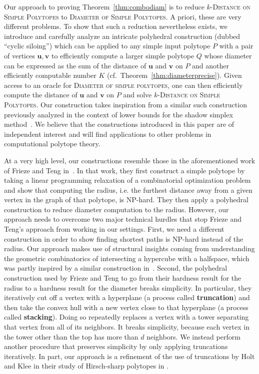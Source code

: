 \documentclass[centering,11pt,reqno]{amsart}
\theoremstyle{definition}
\newcommand{\NP}{\textsc{NP}}
\begin{document}
Our approach to proving Theorem~\ref{thm:combodiam} is to reduce \textsc{$k$-Distance on Simple Polytopes} to \textsc{Diameter of Simple Polytopes}. A priori, these are very different problems. To show that such a reduction nevertheless exists, we introduce and carefully analyze an intricate polyhedral construction (dubbed ``cyclic siloing'') which can be applied to any simple input polytope $P$ with a pair of vertices $\mathbf{u},\mathbf{v}$ to efficiently compute a larger simple polytope $Q$ whose diameter can be expressed as the sum of the distance of $\mathbf{u}$ and $\mathbf{v}$ on $P$ and another efficiently computable number $K$ (cf.~Theorem~\ref{thm:diameterprecise}). Given access to an oracle for \textsc{Diameter of simple polytopes}, one can then efficiently compute the distance of $\mathbf{u}$ and $\mathbf{v}$ on $P$ and solve \textsc{$k$-Distance on Simple Polytopes}. Our construction takes inspiration from a similar such construction previously analyzed in the context of lower bounds for the shadow simplex method~\cite{black2024exponentiallowerboundspivot}. We believe that the constructions introduced in this paper are of independent interest and will find applications to other problems in computational polytope theory.

At a very high level, our constructions resemble those in the aforementioned work of Frieze and Teng in~\cite{FriezeTeng1994}. In that work, they first construct a simple polytope by taking a linear programming relaxation of a combinatorial optimization problem and show that computing the radius, i.e. the furthest distance away from a given vertex in the graph of that polytope, is \NP-hard. They then apply a polyhedral construction to reduce diameter computation to the radius. However, our approach needs to overcome two major technical hurdles that stop Frieze and Teng's approach from working in our settings. First, we need a different construction in order to show finding shortest paths is \NP-hard instead of the radius. Our approach makes use of structural insights coming from understanding the geometric combinatorics of intersecting a hypercube with a halfspace, which was partly inspired by a similar construction in~\cite{PolymatroidsPathHard}. Second, the polyhedral construction used by Frieze and Teng to go from their hardness result for the radius to a hardness result for the diameter breaks simplicity. In particular, they iteratively cut off a vertex with a hyperplane (a process called \textbf{truncation}) and then take the convex hull with a new vertex close to that hyperplane (a process called \textbf{stacking}). Doing so repeatedly replaces a vertex with a tower separating that vertex from all of its neighbors. It breaks simplicity, because each vertex in the tower other than the top has more than $d$ neighbors. We instead perform another procedure that preserves simplicity by only applying truncations iteratively. In part, our approach is a refinement of the use of truncations by Holt and Klee in their study of Hirsch-sharp polytopes in \cite{Hirschsharp}.
\end{document}
